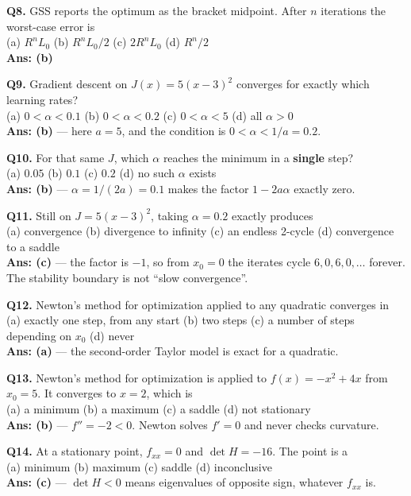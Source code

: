 \begin{mcqbox}
\textbf{Q8.} GSS reports the optimum as the bracket midpoint. After $n$ iterations the worst-case error is\\
(a) $R^nL_0$ \quad (b) $R^nL_0/2$ \quad (c) $2R^nL_0$ \quad (d) $R^{n}/2$\\
\textbf{Ans: (b)}

\textbf{Q9.} Gradient descent on $J(x) = 5(x-3)^2$ converges for exactly which learning rates?\\
(a) $0<\alpha<0.1$ \quad (b) $0<\alpha<0.2$ \quad (c) $0<\alpha<5$ \quad (d) all $\alpha>0$\\
\textbf{Ans: (b)} --- here $a = 5$, and the condition is $0<\alpha<1/a = 0.2$.

\textbf{Q10.} For that same $J$, which $\alpha$ reaches the minimum in a \textbf{single} step?\\
(a) $0.05$ \quad (b) $0.1$ \quad (c) $0.2$ \quad (d) no such $\alpha$ exists\\
\textbf{Ans: (b)} --- $\alpha = 1/(2a) = 0.1$ makes the factor $1-2a\alpha$ exactly zero.

\textbf{Q11.} Still on $J = 5(x-3)^2$, taking $\alpha = 0.2$ exactly produces\\
(a) convergence \quad (b) divergence to infinity \quad (c) an endless 2-cycle \quad (d) convergence to a saddle\\
\textbf{Ans: (c)} --- the factor is $-1$, so from $x_0=0$ the iterates cycle $6, 0, 6, 0, \dots$ forever. The stability boundary is not ``slow convergence''.

\textbf{Q12.} Newton's method for optimization applied to any quadratic converges in\\
(a) exactly one step, from any start \quad (b) two steps \quad (c) a number of steps depending on $x_0$ \quad (d) never\\
\textbf{Ans: (a)} --- the second-order Taylor model is exact for a quadratic.

\textbf{Q13.} Newton's method for optimization is applied to $f(x) = -x^2+4x$ from $x_0 = 5$. It converges to $x = 2$, which is\\
(a) a minimum \quad (b) a maximum \quad (c) a saddle \quad (d) not stationary\\
\textbf{Ans: (b)} --- $f'' = -2 < 0$. Newton solves $f'=0$ and never checks curvature.

\textbf{Q14.} At a stationary point, $f_{xx} = 0$ and $\det H = -16$. The point is a\\
(a) minimum \quad (b) maximum \quad (c) saddle \quad (d) inconclusive\\
\textbf{Ans: (c)} --- $\det H < 0$ means eigenvalues of opposite sign, whatever $f_{xx}$ is.


\end{mcqbox}
